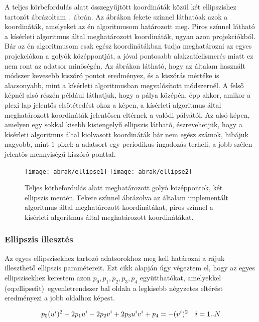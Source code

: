 \documentclass[a4paper,12pt]{article}
\begin{document}
A teljes körbefordulás alatt összegyűjtött koordináták közül két ellipszishez tartozót ábrázoltam .~ábrán. Az ábrákon fekete színnel láthatóak azok a koordináták, amelyeket az én algoritmusom határozott meg. Piros színnel látható a kísérleti algoritmus által meghatározott koordináták, ugyan azon projekciókból. Bár az én algoritmusom csak egész koordinátákban tudja meghatározni az egyes projekciókon a golyók középpontját, a jóval pontosabb alakzatfelismerés miatt ez nem ront az adatsor minőségén. Az ábrákon látható, hogy az általam használt módszer kevesebb kiszóró pontot eredményez, és a kiszórás mértéke is alacsonyabb, mint a kísérleti algoritmusban megvalósított módszernél. A felső képnél alsó részén például láthatjuk, hogy a pálya középén, épp akkor, amikor a plexi lap jelentős elsötétedést okoz a képen, a kísérleti algoritmus által meghatározott koordináták jelentősen eltérnek a valódi pályától. Az alsó képen, amelyen egy sokkal kisebb kistengelyű ellipszis látható, észrevehetjük, hogy a kísérleti algoritmus által kiolvasott koordináták bár nem egész számok, hibájuk nagyobb, mint $1$ pixel: a adatsort egy periodikus ingadozás terheli, a jobb szélen jelentős mennyiségű kiszóró ponttal. 


\begin{figure}[htbp]
\center
\texttt{[image: abrak/ellipse1]}
\texttt{[image: abrak/ellipse2]}
\caption{Teljes körbefordulás alatt meghatározott golyó középpontok, két ellipszis mentén. Fekete színnel ábrázolva az általam implementált algoritmus által meghatározott koordinátákat, piros színnel a kísérleti algoritmus által meghatározott koordinátákat.}
\label{fig:ellipses}
\end{figure}




\subsubsection{Ellipszis illesztés}


Az egyes ellipszisekhez tartozó adatsorokhoz meg kell határozni a rájuk illeszthető ellipszis paramétereit. Ezt  cikk alapján úgy végeztem el, hogy az egyes ellipszisekhez kerestem azon $p_0,p_1,p_2,p_3,p_4$ együtthatókat, amelyekkel \aref({eq:ellipsefit})~egyenletrendszer bal oldala a legkisebb négyzetes eltérést eredményezi a jobb oldalhoz képest. 

\begin{equation}
\label{eq:ellipsefit}
p_0 (u^i)^2 - 2p_1u^i - 2p_2v^i + 2p_3u^iv^i + p_4 = -(v^i)^2 \hskip10pt i=1..N
\end{equation}
\end{document}
